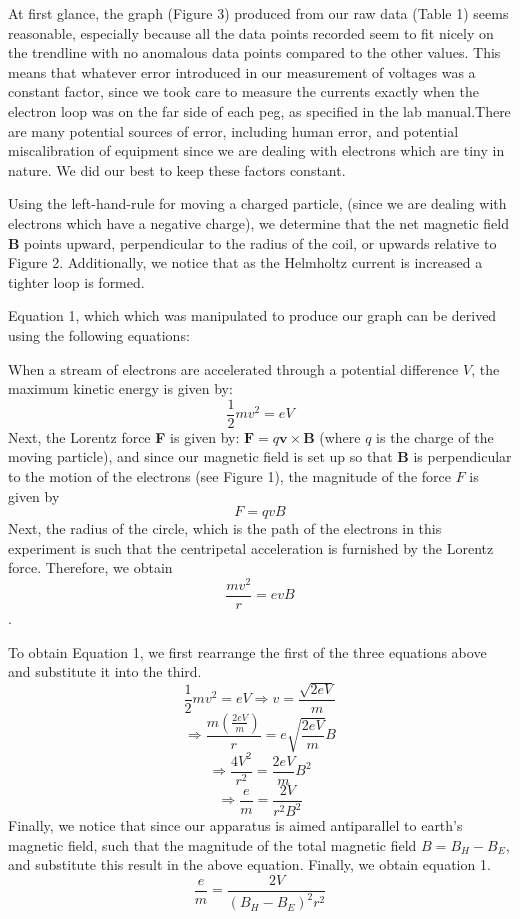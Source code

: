 \documentclass[letterpaper]{article}
\begin{document}
At first glance, the graph (Figure 3) produced from our raw data (Table 1) seems reasonable, especially
because all the data points recorded seem to fit nicely on the trendline with
no anomalous data points compared to the other values. This means that whatever error
introduced in our measurement of voltages was a constant factor, since we took care
to measure the currents exactly when the electron loop was on the far side of each peg, as specified in the
lab manual.There are many potential sources of error, including human error, and potential miscalibration of equipment since we are dealing
with electrons which are tiny in nature. We did our best to keep these factors constant.

Using the left-hand-rule for moving a charged particle, (since we are
dealing with electrons which have a negative charge), we determine that the net magnetic field \textbf{B}
points upward, perpendicular to the radius of the coil, or upwards relative to Figure 2. Additionally, we notice that
as the Helmholtz current is increased a tighter loop is formed.

Equation 1, which which was manipulated to produce our graph can be derived using the following equations:

\noindent When a stream of electrons are accelerated through a potential difference $V$, the maximum
kinetic energy is given by:
$$\frac{1}{2}mv^2 = eV$$
Next, the Lorentz force \textbf{F} is given by:
$\textbf{F}=q\textbf{v}\times \textbf{B}$
(where $q$ is the charge of the moving particle), and since our magnetic field is set up so that \textbf{B} is perpendicular to the motion of the electrons (see Figure 1),
the magnitude of the force $F$ is given by $$F=qvB$$
Next, the radius of the circle, which is the path of the electrons in this experiment is such that
the centripetal acceleration is furnished by the Lorentz force. Therefore, we obtain $$\frac{mv^2}{r}=evB$$.

\noindent To obtain Equation 1, we first rearrange the first of the three equations above and substitute it into the third.
$$\frac{1}{2}mv^2 = eV \Rightarrow v=\frac{\sqrt{2eV}}{m}$$
$$\Rightarrow \frac{m(\frac{2eV}{m})}{r}=e\sqrt{\frac{2eV}{m}}B$$
$$\Rightarrow \frac{4V^2}{r^2}=\frac{2eV}{m}B^2$$
$$\Rightarrow \frac{e}{m} = \frac{2V}{r^2B^2}$$
Finally, we notice that since our apparatus is aimed antiparallel to earth's magnetic field, such that
the magnitude of the total magnetic field $B=B_H-B_E$, and substitute this result in the above equation.
Finally, we obtain equation 1.
$$\frac{e}{m} = \frac{2V}{(B_H-B_E)^2r^2}$$
\end{document}
